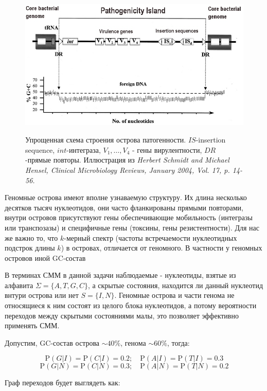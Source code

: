 \documentclass[letterpaper, 11pt]{article}
\newcommand{\prob}{\mathrm{P}}
\begin{document}
\begin{figure}
\centering
\includegraphics[height=7cm]{images/island.png}
\caption{Упрощенная схема строения острова патогенности. $IS$-insertion sequence, $int$-интеграза, $V_1,\ldots,V_4$ - гены вирулентности, $DR$ -прямые повторы. Иллюстрация из \textit{Herbert Schmidt and Michael Hensel, Clinical Microbiology Reviews, January 2004, Vol. 17, p. 14-56.}}
\label{fig:island}
\end{figure}



Геномные острова имеют вполне узнаваемую структуру. Их длина несколько десятков тысяч нуклеотидов, они часто фланкированы прямыми повторами, внутри островов присутствуют гены обеспечивающие мобильность (интегразы или транспозазы) и специфичные гены (токсины, гены резистентности). Для нас же важно то, что $k$-мерный спектр (частоты встречаемости нуклеотидных подстрок длины $k$) в островах,  отличается от геномного. В частности у геномных островов иной GC-состав


В терминах СММ в данной задачи наблюдаемые - нуклеотиды, взятые из алфавита $\Sigma=\{A,T,G,C\}$, а скрытые состояния, находится ли данный нуклеотид внтури острова или нет $S=\{I,N\}$. Геномные острова и части генома не относящиеся к ним состоят из целого блока нуклеотидов, а потому вероятности переходов между скрытыми состояниями малы, это позволяет эффективно применять СММ.

Допустим, GC-состав острова $\sim 40\%$, генома $\sim 60\%$, тогда:

$$\prob(G|I)=\prob(C|I)=0.2;\quad \prob(A|I)=\prob(T|I)=0.3$$
$$\prob(G|N)=\prob(C|N)=0.3;\quad \prob(A|N)=\prob(T|N)=0.2$$

Граф переходов будет выглядеть как:
\end{document}
